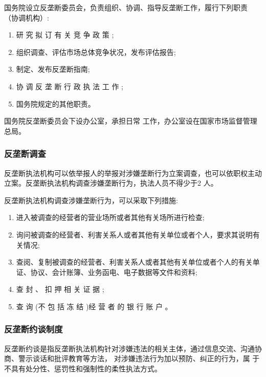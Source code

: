 \documentclass[UTF8,12pt]{ctexart}
\numberwithin{equation}{section} %
\numberwithin{figure}{section}
\numberwithin{table}{section}
\begin{document}
	
	国务院设立反垄断委员会，负责组织、协调、指导反垄断工作，履行下列职责 （协调机构）:
	\begin{enumerate}
		\item 研 究 拟 订 有 关 竞 争 政 策 ;
		
		\item 组织调查、评估市场总体竞争状况，发布评估报告;
		
		\item 制定、发布反垄断指南;
		
		\item 协 调 反 垄 断 行 政 执 法 工 作 ;
		
		\item 国务院规定的其他职责。
	\end{enumerate}
	国务院反垄断委员会下设办公室，承担日常 工作，办公室设在国家市场监督管理总局。

	
	\subsubsection{反垄断调查}
	反垄断执法机构可以依举报人的举报对涉嫌垄断行为立案调查，也可以依职权主动立案。反垄断执法机构调查涉嫌垄断行为，执法人员不得少于2 人。
	
	反垄断执法机构调查涉嫌垄断行为，可以采取下列措施:
	\begin{enumerate}
		\item 进入被调查的经营者的营业场所或者其他有关场所进行检查;
		
		\item 询问被调查的经营者、利害关系人或者其他有关单位或者个人，要求其说明有关情况;
		
		\item 查阅、复制被调查的经营者、利害关系人或者其他有关单位或者个人的有关单证、协议、会计账簿、业务函电、电子数据等文件和资料;
		
		\item  查 封 、 扣 押 相 关 证 据 ;
		
		\item  查 询 (不 包 括 冻 结 )经 营 者 的 银 行 账 户 。
	\end{enumerate}
	
	
	\subsubsection{反垄断约谈制度}
	反垄断约谈是指反垄断执法机构针对涉嫌违法的相关主体，通过信息交流、沟通协商、警示谈话和批评教育等方法， 对涉嫌违法行为加以预防、纠正的行为，属 于不具有处分性、惩罚性和强制性的柔性执法方式。
	
\end{document}
